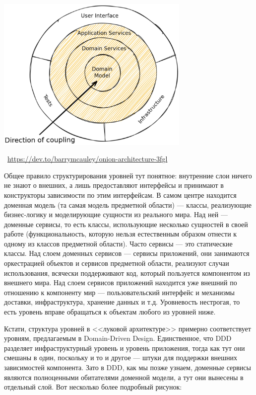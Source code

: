 \documentclass[a5paper]{article}
\newcommand{\attribution}[1] {
    \vspace{-4mm}\begin{flushright}\begin{scriptsize}\textcolor{gray}
    {\textcopyright\, #1}\end{scriptsize}\end{flushright}
}
\begin{document}
\begin{center}
    \includegraphics[width=0.7\textwidth]{onionArchitecture.png}
    \attribution{\url{https://dev.to/barrymcauley/onion-architecture-3fgl}}
\end{center}

Общее правило структурирования уровней тут понятное: внутренние слои ничего не знают о внешних, а лишь предоставляют интерфейсы и принимают в конструкторы зависимости по этим интерфейсам. В самом центре находится доменная модель (та самая модель предметной области) --- классы, реализующие бизнес-логику и моделирующие сущности из реального мира. Над ней --- доменные сервисы, то есть классы, использующие несколько сущностей в своей работе (функциональность, которую нельзя естественным образом отнести к одному из классов предметной области). Часто сервисы --- это статические классы. Над слоем доменных сервисов --- сервисы приложений, они занимаются оркестрацией объектов и сервисов предметной области, реализуют случаи использования, всячески поддерживают код, который пользуется компонентом из внешнего мира. Над слоем сервисов приложений находится уже внешний по отношению к компоненту мир --- пользовательский интерфейс и механизмы доставки, инфраструктура, хранение данных и т.д. Уровневость нестрогая, то есть уровень вправе обращаться к объектам любого из уровней ниже.

Кстати, структура уровней в <<луковой архитектуре>> примерно соответствует уровням, предлагаемым в Domain-Driven Design. Единственное, что DDD разделяет инфраструктурный уровень и уровень приложения, тогда как тут они смешаны в один, поскольку и то и другое --- штуки для поддержки внешних зависимостей компонента. Зато в DDD, как мы позже узнаем, доменные сервисы являются полноценными обитателями доменной модели, а тут они вынесены в отдельный слой. Вот несколько более подробный рисунок:
\end{document}
